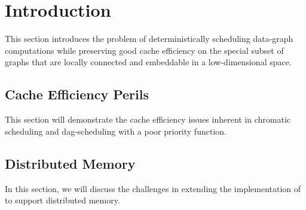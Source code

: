 \section{Introduction}
\label{sec:intro}

This section introduces the problem of deterministically scheduling data-graph
computations while preserving good cache efficiency on the special subset of graphs
that are locally connected and embeddable in a low-dimensional space.  

\subsection{Cache Efficiency Perils}

This section will demonstrate the cache efficiency issues inherent in chromatic
scheduling and dag-scheduling with a poor priority function.  

\subsection{Distributed Memory}

In this section, we will discuss
the challenges in extending the implementation of  to support
distributed memory. 
